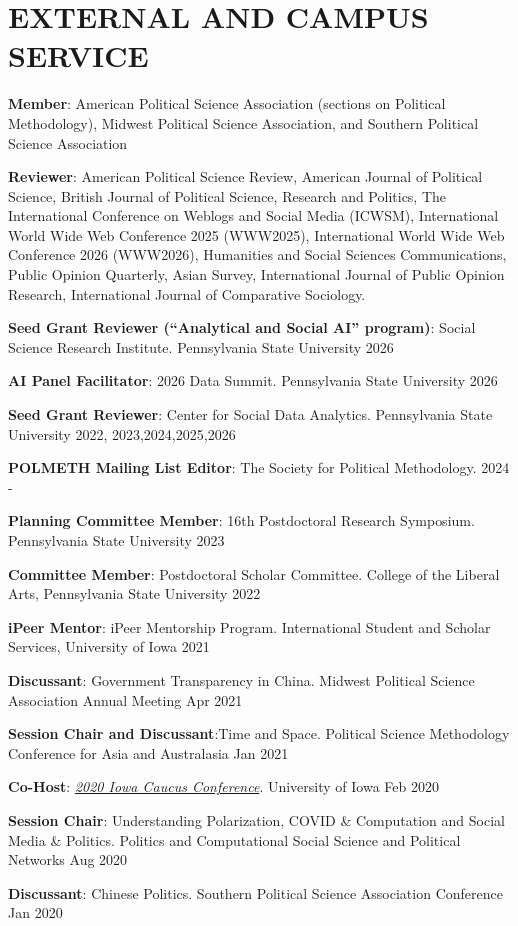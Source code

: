 \documentclass[10.5pt,]{article}
\providecommand{\tightlist}{%
	\setlength{\itemsep}{0pt}\setlength{\parskip}{0pt}}
\renewenvironment{itemize}{
	\begin{list}{}{
			\setlength{\leftmargin}{1.5em}
		}
	}{
	\end{list}
}
\begin{document}
\section{EXTERNAL AND CAMPUS SERVICE}\label{external-and-campus-service}

\begin{itemize}
\tightlist
\item
  \textbf{Member}: American Political Science Association (sections on
  Political Methodology), Midwest Political Science Association, and
  Southern Political Science Association
\item
  \textbf{Reviewer}: American Political Science Review, American Journal
  of Political Science, British Journal of Political Science, Research
  and Politics, The International Conference on Weblogs and Social Media
  (ICWSM), International World Wide Web Conference 2025 (WWW2025),
  International World Wide Web Conference 2026 (WWW2026), Humanities and
  Social Sciences Communications, Public Opinion Quarterly, Asian
  Survey, International Journal of Public Opinion Research,
  International Journal of Comparative Sociology.
\item
  \textbf{Seed Grant Reviewer (``Analytical and Social AI'' program)}:
  Social Science Research Institute. Pennsylvania State University
  \hfill 2026
\item
  \textbf{AI Panel Facilitator}: 2026 Data Summit. Pennsylvania State
  University \hfill 2026
\item
  \textbf{Seed Grant Reviewer}: Center for Social Data Analytics.
  Pennsylvania State University \hfill 2022, 2023,2024,2025,2026
\item
  \textbf{POLMETH Mailing List Editor}: The Society for Political
  Methodology. \hfill 2024 -
\item
  \textbf{Planning Committee Member}: 16th Postdoctoral Research
  Symposium. Pennsylvania State University \hfill2023
\item
  \textbf{Committee Member}: Postdoctoral Scholar Committee. College of
  the Liberal Arts, Pennsylvania State University \hfill 2022
\item
  \textbf{iPeer Mentor}: iPeer Mentorship Program. International Student
  and Scholar Services, University of Iowa \hfill 2021
\item
  \textbf{Discussant}: Government Transparency in China. Midwest
  Political Science Association Annual Meeting \hfill Apr 2021
\item
  \textbf{Session Chair and Discussant}:Time and Space. Political
  Science Methodology Conference for Asia and Australasia \hfill  Jan
  2021
\item
  \textbf{Co-Host}:
  \href{https://clas.uiowa.edu/polisci/Shambaugh-2020Caucus}{\emph{2020
  Iowa Caucus Conference}}. University of Iowa \hfill Feb 2020
\item
  \textbf{Session Chair}: Understanding Polarization, COVID \&
  Computation and Social Media \& Politics. Politics and Computational
  Social Science and Political Networks \hfill Aug 2020
\item
  \textbf{Discussant}: Chinese Politics. Southern Political Science
  Association Conference \hfill Jan 2020
\end{itemize}
\end{document}

